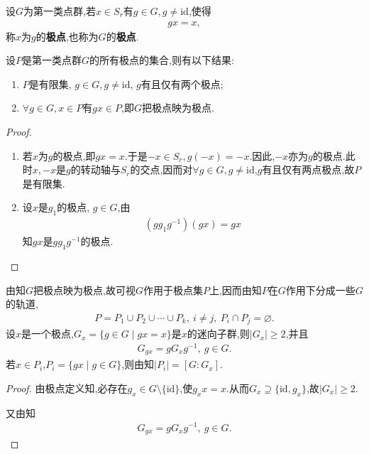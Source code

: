 \documentclass[../../main.tex]{subfiles}%
\begin{document}
\begin{definition}
设$G$为第一类点群,若$x \in S_r$有$g \in G, g \neq \text{id}$,使得
\begin{align*}
gx=x,
\end{align*}
称$x$为$g$的\textbf{极点},也称为$G$的\textbf{极点}.
\end{definition}

\begin{lemma}\label{lemma:抽象代数--引理4.9.1}
设$P$是第一类点群$G$的所有极点的集合,则有以下结果:
\begin{enumerate}[(1)]
\item\label{lemma:抽象代数--引理4.9.1-1} $P$是有限集, $g \in G, g \neq \text{id}$, $g$有且仅有两个极点;

\item\label{lemma:抽象代数--引理4.9.1-2} $\forall g \in G, x \in P$有$gx \in P$,即$G$把极点映为极点.
\end{enumerate}
\end{lemma}
\begin{proof}
\begin{enumerate}[(1)]
\item 若$x$为$g$的极点,即$gx=x$.于是$-x \in S_r, g(-x)=-x$.因此,$-x$亦为$g$的极点.此时$x,-x$是$g$的转动轴与$S_r$的交点,因而对$\forall g \in G, g \neq \text{id}$,$g$有且仅有两点极点,故$P$是有限集.

\item 设$x$是$g_1$的极点, $g \in G$,由
\begin{align*}
(gg_1g^{-1})(gx)=gx
\end{align*}
知$gx$是$gg_1g^{-1}$的极点.
\end{enumerate}
\end{proof}

\begin{corollary}\label{corollary:点群在极点集上的作用--轨道分解和迷向子群}
由知$G$把极点映为极点,故可视$G$作用于极点集$P$上,因而由知$P$在$G$作用下分成一些$G$的轨道,
\begin{align*}
P=P_1\cup P_2\cup\cdots\cup P_k,\ i\neq j,\ P_i\cap P_j=\varnothing.
\end{align*}
设$x$是一个极点,$G_x=\{g\in G\mid gx=x\}$是$x$的迷向子群,则$|G_x|\geqslant 2$,并且
\begin{align*}
G_{gx}=gG_xg^{-1},\ g\in G.
\end{align*}
若$x\in P_i$,$P_i=\{gx\mid g\in G\}$,则由知$|P_i|=[G:G_x]$.
\end{corollary}
\begin{proof}
由极点定义知,必存在$g_x\in G\setminus \{\text{id}\}$,使$g_xx=x$.从而$G_x\supseteq \{\text{id},g_x\}$,故$|G_x|\geqslant 2$.

又由知
\begin{align*}
G_{gx}=gG_xg^{-1},\ g\in G.
\end{align*}
\end{proof}
\end{document}
